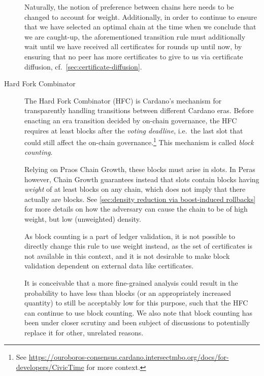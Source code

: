 \begin{description}
  Naturally, the notion of preference between chains here needs to be changed to account for weight.
  Additionally, in order to continue to ensure that we have selected an optimal chain at the time when we conclude that we are caught-up, the aforementioned transition rule must additionally wait until we have received all certificates for rounds up until now, by ensuring that no peer has more certificates to give to us via certificate diffusion, cf.~\cref{sec:certificate-diffusion}.
\item[Hard Fork Combinator]
  The Hard Fork Combinator (HFC) is Cardano's mechanism for transparently handling transitions between different Cardano eras.
  Before enacting an era transition decided by on-chain governance, the HFC requires at least \kcp{} blocks after the \emph{voting deadline}, i.e.\ the last slot that could still affect the on-chain governance.\footnote{
    See \url{https://ouroboros-consensus.cardano.intersectmbo.org/docs/for-developers/CivicTime} for more context.}
  This mechanism is called \emph{block counting}.

  Relying on Praos Chain Growth, these \kcp{} blocks must arise in \Tcp{} slots.
  In Peras however, Chain Growth guarantees instead that \Tcp{} slots contain blocks having \emph{weight} of at least \kcp{} blocks on any chain, which does not imply that there actually are \kcp{} blocks.
  See \cref{sec:density reduction via boost-induced rollbacks} for more details on how the adversary can cause the chain to be of high weight, but low (unweighted) density.

  As block counting is a part of ledger validation, it is not possible to directly change this rule to use weight instead, as the set of certificates is not available in this context, and it is not desirable to make block validation dependent on external data like certificates.

  It is conceivable that a more fine-grained analysis could result in the probability to have less than \kcp{} blocks (or an appropriately increased quantity) to still be acceptably low for this purpose, such that the HFC can continue to use block counting.
  We also note that block counting has been under closer scrutiny and been subject of discussions to potentially replace it for other, unrelated reasons.
\end{description}


